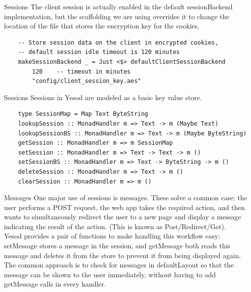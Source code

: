 \documentclass[pdf]{beamer}
\begin{document}
\begin{frame}[fragile]{Sessions}
  The client session is actually enabled in the default sessionBackend
  implementation, but the scaffolding we are using overrides it to
  change the location of the file that stores the encryption key for
  the cookies. \\

  \begin{verbatim}
    -- Store session data on the client in encrypted cookies,
    -- default session idle timeout is 120 minutes
    makeSessionBackend _ = Just <$> defaultClientSessionBackend
        120    -- timeout in minutes
        "config/client_session_key.aes"
  \end{verbatim}
\end{frame}

\begin{frame}[fragile]{Sessions}
  Sessions in Yesod are modeled as a basic key value store. \\

  \begin{verbatim}
    type SessionMap = Map Text ByteString
    lookupSession :: MonadHandler m => Text -> m (Maybe Text)
    lookupSessionBS :: MonadHandler m => Text -> m (Maybe ByteString)
    getSession :: MonadHandler m => m SessionMap
    setSession :: MonadHandler m => Text -> Text -> m ()
    setSessionBS :: MonadHandler m => Text -> ByteString -> m ()
    deleteSession :: MonadHandler m => Text -> m ()
    clearSession :: MonadHandler m => m ()
  \end{verbatim}
\end{frame}

\begin{frame}{Messages}
  One major use of sessions is messages. These solve a common case:
  the user performs a POST request, the web app takes the required
  action, and then wants to simultaneously redirect the user to a new
  page and display a message indicating the result of the
  action. (This is known as Post/Redirect/Get). \\

  Yesod provides a pair of functions to make handling this workflow
  easy: setMessage stores a message in the session, and getMessage
  both reads this message and deletes it from the store to prevent it
  from being displayed again. \\

  The common approach is to check for messages in defaultLayout so
  that the message can be shown to the user immediately, without
  having to add getMessage calls in every handler.
\end{frame}
\end{document}
